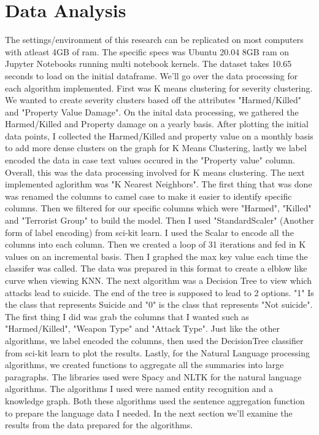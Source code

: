 \documentclass{article}
\begin{document}
\section{Data Analysis}
\begin{multicols}{2}
The settings/environment of this research can be replicated on most computers with atleast 4GB of ram. The specific specs was Ubuntu 20.04 8GB ram on Jupyter Notebooks running multi notebook kernels. The dataset takes 10.65 seconds to load on the initial dataframe. We'll go over the data processing for each algorithm implemented. First was K means clustering for severity clustering. We wanted to create severity clusters based off the attributes "Harmed/Killed" and "Property Value Damage". On the inital data processing, we gathered the Harmed/Killed and Property damage on a yearly basis. After plotting the initial data points, I collected the Harmed/Killed and property value on a monthly basis to add more dense clusters on the graph for K Means Clustering, lastly we label encoded the data in case text values occured in the "Property value" column. Overall, this was the data processing involved for K means clustering. The next implemented aglorithm was "K Nearest Neighbors". The first thing that was done was renamed the columns to camel case to make it easier to identify specific columns. Then we filtered for our specific columns which were "Harmed", "Killed" and "Terrorist Group" to build the model. Then I used  "StandardScaler" (Another form of label encoding) from sci-kit learn. I used the Scalar to encode all the columns into each column. Then we created a loop of 31 iterations and fed in K values on an incremental basis. Then I graphed the max key value each time the classifer was called. The data was prepared in this format to create a elblow like curve when viewing KNN. The next algorithm was a Decision Tree to view which attacks lead to suicide. The end of the tree is supposed to lead to 2 options. "1" Is the class that represents  Suicide and "0" is the class that represents "Not suicide". The first thing I did was grab the columns that I wanted such as "Harmed/Killed", "Weapon Type" and "Attack Type". Just like the other algorithms, we label encoded the columns, then used the DecisionTree classifier from sci-kit learn to plot the results. Lastly, for the Natural Language processing algorithms, we created functions to aggregate all the summaries into large paragraphs. The libraries used were Spacy and NLTK for the natural language algorithms. The algorithms I used were named entity recognition and a knowledge graph. Both these algorithms used the sentence aggregation function to prepare the language data I needed. In the next section we'll examine the results from the data prepared for the algorithms.

\end{multicols} 





 
\end{document}
